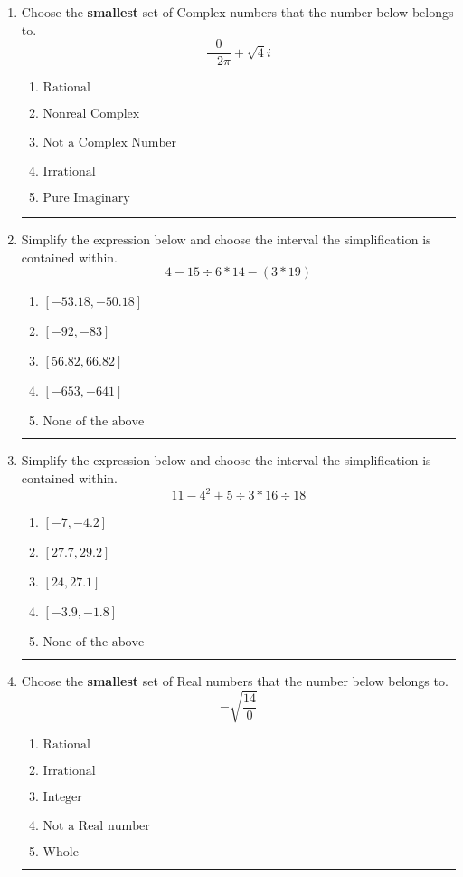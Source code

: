 \documentclass[14pt]{extbook}
\newcommand{\litem}[1]{\item#1\hspace*{-1cm}\rule{\textwidth}{0.4pt}}
\begin{document}
\begin{enumerate}
\litem{
Choose the \textbf{smallest} set of Complex numbers that the number below belongs to.\[ \frac{0}{-2 \pi}+\sqrt{4}i \]\begin{enumerate}[label=\Alph*.]
\item \( \text{Rational} \)
\item \( \text{Nonreal Complex} \)
\item \( \text{Not a Complex Number} \)
\item \( \text{Irrational} \)
\item \( \text{Pure Imaginary} \)

\end{enumerate} }
\litem{
Simplify the expression below and choose the interval the simplification is contained within.\[ 4 - 15 \div 6 * 14 - (3 * 19) \]\begin{enumerate}[label=\Alph*.]
\item \( [-53.18, -50.18] \)
\item \( [-92, -83] \)
\item \( [56.82, 66.82] \)
\item \( [-653, -641] \)
\item \( \text{None of the above} \)

\end{enumerate} }
\litem{
Simplify the expression below and choose the interval the simplification is contained within.\[ 11 - 4^2 + 5 \div 3 * 16 \div 18 \]\begin{enumerate}[label=\Alph*.]
\item \( [-7, -4.2] \)
\item \( [27.7, 29.2] \)
\item \( [24, 27.1] \)
\item \( [-3.9, -1.8] \)
\item \( \text{None of the above} \)

\end{enumerate} }
\litem{
Choose the \textbf{smallest} set of Real numbers that the number below belongs to.\[ -\sqrt{\frac{14}{0}} \]\begin{enumerate}[label=\Alph*.]
\item \( \text{Rational} \)
\item \( \text{Irrational} \)
\item \( \text{Integer} \)
\item \( \text{Not a Real number} \)
\item \( \text{Whole} \)


\end{enumerate}}
\end{enumerate}
\end{document}
